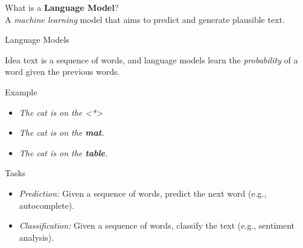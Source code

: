\documentclass[presentation, 10pt]{beamer}\mode<presentation>{\usetheme{AMSBolognaFC}}
\begin{document}
\begin{frame}[plain]
	\centering
	\huge{
		What is a \textbf{Language Model}?
	}
	\\[1em]
	\large{
		{A \emph{machine learning} model that aims to predict and generate plausible text.}
	}
\end{frame}
\begin{frame}{Language Models}
	\begin{exampleblock}{Idea}
		text is a sequence of words, and language models learn the \emph{probability} of a word given the previous words.
	\end{exampleblock}
	\begin{exampleblock}{Example}
		\begin{itemize}
			\item \emph{The cat is on the <*>}
			\item \emph{The cat is on the \textbf{mat}.}
			\item \emph{The cat is on the \textbf{table}.}
		\end{itemize}
	\end{exampleblock}
	\begin{alertblock}{Tasks}
		\begin{itemize}
			\item \emph{Prediction:} Given a sequence of words, predict the next word (e.g., autocomplete).
			\item \emph{Classification:} Given a sequence of words, classify the text (e.g., sentiment analysis).
		\end{itemize}
	\end{alertblock}
\end{frame}
\end{document}
